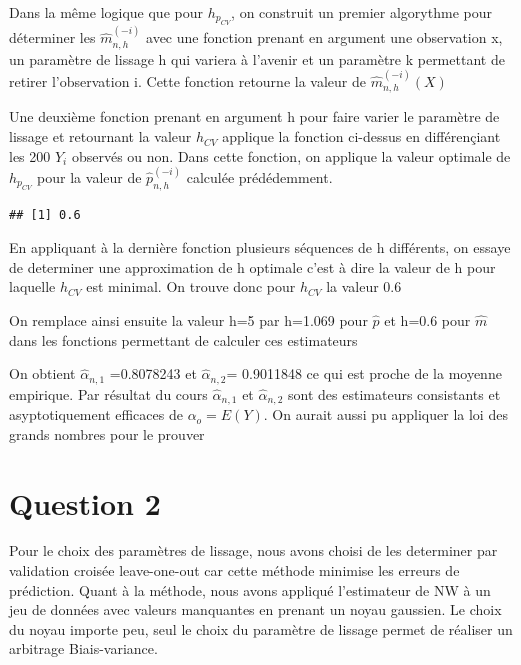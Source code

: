 \documentclass[
]{article}
\begin{document}
Dans la même logique que pour \(h_{p_{CV}}\), on construit un premier
algorythme pour déterminer les \(\hat m_{n,h}^{(-i)}\) avec une fonction
prenant en argument une observation x, un paramètre de lissage h qui
variera à l'avenir et un paramètre k permettant de retirer l'observation
i. Cette fonction retourne la valeur de \(\hat m_{n,h}^{(-i)}(X)\)

Une deuxième fonction prenant en argument h pour faire varier le
paramètre de lissage et retournant la valeur \(h_{CV}\) applique la
fonction ci-dessus en différençiant les 200 \(Y_i\) observés ou non.
Dans cette fonction, on applique la valeur optimale de \(h_{p_{CV}}\)
pour la valeur de \(\hat p_{n,h}^{(-i)}\) calculée prédédemment.

\begin{verbatim}
## [1] 0.6
\end{verbatim}

En appliquant à la dernière fonction plusieurs séquences de h
différents, on essaye de determiner une approximation de h optimale
c'est à dire la valeur de h pour laquelle \(h_{CV}\) est minimal. On
trouve donc pour \(h_{CV}\) la valeur 0.6

On remplace ainsi ensuite la valeur h=5 par h=1.069 pour \(\hat p\) et
h=0.6 pour \(\hat m\) dans les fonctions permettant de calculer ces
estimateurs

On obtient \(\hat \alpha_{n,1}\) =0.8078243 et \(\hat \alpha_{n,2}\)=
0.9011848 ce qui est proche de la moyenne empirique. Par résultat du
cours \(\hat \alpha_{n,1}\) et \(\hat \alpha_{n,2}\) sont des
estimateurs consistants et asyptotiquement efficaces de
\(\alpha_o= E(Y)\). On aurait aussi pu appliquer la loi des grands
nombres pour le prouver

\hypertarget{question-2-1}{%
\section{Question 2}\label{question-2-1}}

Pour le choix des paramètres de lissage, nous avons choisi de les
determiner par validation croisée leave-one-out car cette méthode
minimise les erreurs de prédiction. Quant à la méthode, nous avons
appliqué l'estimateur de NW à un jeu de données avec valeurs manquantes
en prenant un noyau gaussien. Le choix du noyau importe peu, seul le
choix du paramètre de lissage permet de réaliser un arbitrage
Biais-variance.
\end{document}

